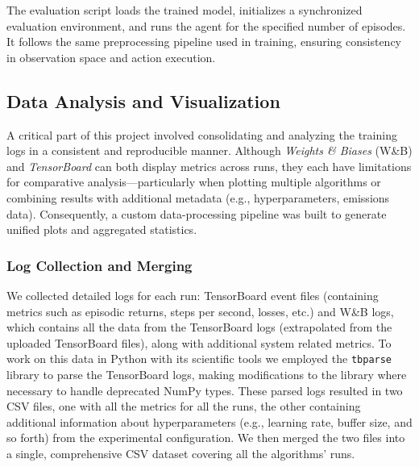 The evaluation script loads the trained model, initializes a synchronized evaluation environment, and runs the agent for the specified number of episodes. It follows the same preprocessing pipeline used in training, ensuring consistency in observation space and action execution.

\subsection{Data Analysis and Visualization}
\label{subsec:data_analysis}

A critical part of this project involved consolidating and analyzing the training logs in a consistent and reproducible manner. Although \textit{Weights \& Biases} (W\&B) and \textit{TensorBoard} can both display metrics across runs, they each have limitations for comparative analysis—particularly when plotting multiple algorithms or combining results with additional metadata (e.g., hyperparameters, emissions data). Consequently, a custom data-processing pipeline was built to generate unified plots and aggregated statistics.

\subsubsection{Log Collection and Merging}
We collected detailed logs for each run: TensorBoard event files (containing metrics such as episodic returns, steps per second, losses, etc.) and W\&B logs, which contains all the data from the TensorBoard logs (extrapolated from the uploaded TensorBoard files), along with additional system related metrics. To work on this data in Python with its scientific tools we employed the \texttt{tbparse} library to parse the TensorBoard logs, making modifications to the library where necessary to handle deprecated NumPy types. These parsed logs resulted in two CSV files, one with all the metrics for all the runs, the other containing additional information about hyperparameters (e.g., learning rate, buffer size, and so forth) from the experimental configuration. We then merged the two files into a single, comprehensive CSV dataset covering all the algorithms' runs.


